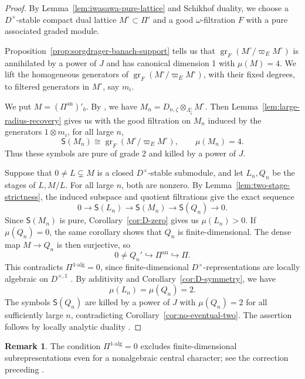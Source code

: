 \documentclass[11pt]{article}
\theoremstyle{definition}
\newtheorem{remark}[theorem]{Remark}
\newcommand{\gr}{\operatorname{gr}}
\begin{document}
\begin{proof}
By Lemma~\ref{lem:iwasawa-pure-lattice} and Schikhof duality,
we choose a $D^\times$-stable compact dual lattice $M^\circ\subset\Pi'$ and a good
$\omega$-filtration $F$ with a pure associated graded module.

Proposition~\ref{prop:sorgdrager-banach-support} tells us that $\gr_F(M^\circ/\varpi_EM^\circ)$ is annihilated by a power of $J$
and has canonical dimension 1 with $\mu(M)=4$. We lift the homogeneous generators of $\gr_F(M^\circ/\varpi_EM^\circ)$, with their fixed degrees, to filtered generators in $M^\circ$, say $m_i$.

We put $M=(\Pi^{\mathrm{an}})'_b$. By \cite[Theorem~7.1]{ST03}, we have
$M_n=D_{n,\zeta}\otimes_{\Lambda_\zeta^\circ}M^\circ$.
Then Lemma~\ref{lem:large-radius-recovery} gives us with the good filtration on $M_n$ induced by the generators $1\otimes m_i$, 
for all large $n$,
\[
 \mathsf S(M_n)\cong\gr_F(M^\circ/\varpi_EM^\circ),\qquad
 \mu(M_n)=4.
\]
Thus these symbols are pure of grade 2 and killed by a power of $J$.

Suppose that $0\ne L\subsetneq M$ is a closed $D^\times$-stable
submodule, and let $L_n,Q_n$ be the stages of $L,M/L$.
For all large $n$, both are nonzero. By Lemma~\ref{lem:two-stage-strictness},
the induced subspace and quotient filtrations give the exact sequence
\[
 0\longrightarrow\mathsf S(L_n)
 \longrightarrow\mathsf S(M_n)
 \longrightarrow\mathsf S(Q_n)\longrightarrow0.
\]
Since $\mathsf{S}(M_n)$ is pure, Corollary~\ref{cor:D-zero} gives us
$\mu(L_n)>0$.
If $\mu(Q_n)=0$, the same corollary shows that $Q_n$
is finite-dimensional. The dense map $M\to Q_n$ is then surjective,
so
\[
 0\ne Q_n'\hookrightarrow\Pi^{\mathrm{an}}\hookrightarrow\Pi.
\]
This contradicts $\Pi^{1\text{-}\mathrm{alg}}=0$, since finite-dimensional
$D^\times$-representations are locally algebraic on $D^{\times,1}$
\cite[Lemma~4.22]{LiuWang2025}.
By additivity and Corollary~\ref{cor:D-symmetry}, we have
\[
 \mu(L_n)=\mu(Q_n)=2.
\]
The symbols $\mathsf S(Q_n)$ are killed by a power of $J$ with $\mu(Q_n)=2$ 
for all sufficiently large $n$, contradicting Corollary~\ref{cor:no-eventual-two}.
The assertion follows by locally analytic duality \cite[Theorem~6.3]{ST03}.
\end{proof}

\begin{remark}
The condition $\Pi^{1\text{-}\mathrm{alg}}=0$ excludes
finite-dimensional subrepresentations even for a nonalgebraic
central character; see the correction preceding
\cite[Theorem~5.3]{LiuWang2025}.
\end{remark}
\end{document}
